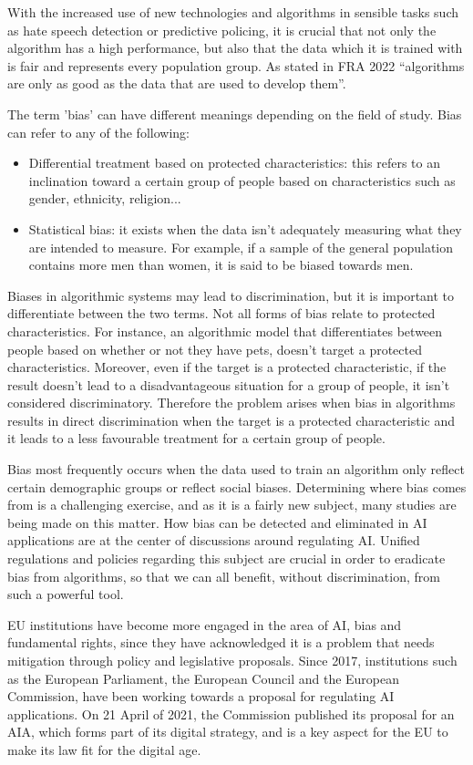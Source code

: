 With the increased use of new technologies and algorithms in sensible tasks such as hate speech detection or predictive policing, it is crucial that not only the algorithm has a high performance, but also that the data which it is trained with is fair and represents every population group. As stated in FRA 2022 \cite{FRA2022} ``algorithms are only as good as the data that are used to develop them''. 

The term 'bias' can have different meanings depending on the field of study. Bias can refer to any of the following:
\begin{itemize}
    \item Differential treatment based on protected characteristics: this refers to an inclination toward a certain group of people based on characteristics such as gender, ethnicity, religion...
    \item Statistical bias: it exists when the data isn't adequately measuring what they are intended to measure. For example, if a sample of the general population contains more men than women, it is said to be biased towards men.
\end{itemize}
Biases in algorithmic systems may lead to discrimination, but it is important to differentiate between the two terms. Not all forms of bias relate to protected characteristics. For instance, an algorithmic model that differentiates between people based on whether or not they have pets, doesn't target a protected characteristics. Moreover, even if the target is a protected characteristic, if the result doesn't lead to a disadvantageous situation for a group of people, it isn't considered discriminatory. Therefore the problem arises when bias in algorithms results in direct discrimination when the target is a protected characteristic and it leads to a less favourable treatment for a certain group of people. 

Bias most frequently occurs when the data used to train an algorithm only reflect certain demographic groups or reflect social biases. Determining where bias comes from is a challenging exercise, and as it is a fairly new subject, many studies are being made on this matter. How bias can be detected and eliminated in AI applications are at the center of discussions around regulating AI. Unified regulations and policies regarding this subject are crucial in order to eradicate bias from algorithms, so that we can all benefit, without discrimination, from such a powerful tool. 

EU institutions have become more engaged in the area of AI, bias and fundamental rights, since they have acknowledged it is a problem that needs mitigation through policy and legislative proposals. Since 2017, institutions such as the European Parliament, the European Council and the European Commission, have been working towards a proposal for regulating AI applications. On 21 April of 2021, the Commission published its proposal for an \acrshort{AIA}, which forms part of its digital strategy, and is a key aspect for the EU to make its law fit for the digital age.

